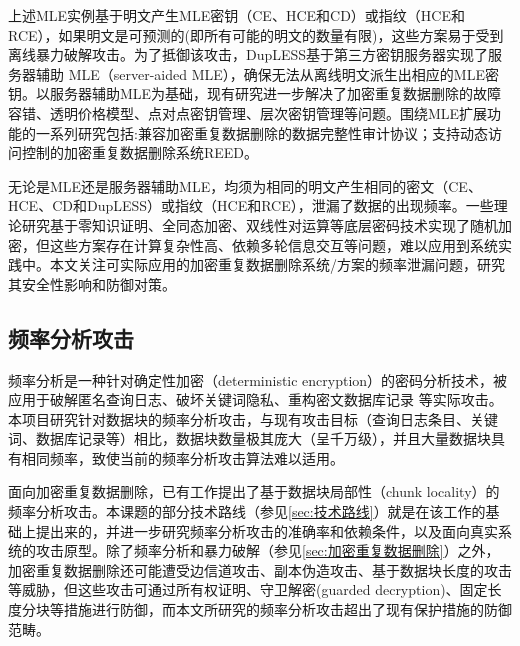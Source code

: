 上述MLE实例基于明文产生MLE密钥（CE、HCE和CD）或指纹（HCE和RCE），如果明文是可预测的(即所有可能的明文的数量有限)，这些方案易于受到离线暴力破解攻击。为了抵御该攻击，DupLESS基于第三方密钥服务器实现了服务器辅助 MLE（server-aided MLE），确保无法从离线明文派生出相应的MLE密钥。以服务器辅助MLE为基础，现有研究进一步解决了加密重复数据删除的故障容错、透明价格模型、点对点密钥管理、层次密钥管理等问题。围绕MLE扩展功能的一系列研究包括:兼容加密重复数据删除的数据完整性审计协议；支持动态访问控制的加密重复数据删除系统REED。

无论是MLE还是服务器辅助MLE，均须为相同的明文产生相同的密文（CE、HCE、CD和DupLESS）或指纹（HCE和RCE），泄漏了数据的出现频率。一些理论研究基于零知识证明、全同态加密、双线性对运算等底层密码技术实现了随机加密，但这些方案存在计算复杂性高、依赖多轮信息交互等问题，难以应用到系统实践中。本文关注可实际应用的加密重复数据删除系统/方案的频率泄漏问题，研究其安全性影响和防御对策。

\subsection{频率分析攻击}
\label{sec:传统频率分析攻击}

频率分析是一种针对确定性加密（deterministic encryption）的密码分析技术，被应用于破解匿名查询日志、破坏关键词隐私、重构密文数据库记录 等实际攻击。本项目研究针对数据块的频率分析攻击，与现有攻击目标（查询日志条目、关键词、数据库记录等）相比，数据块数量极其庞大（呈千万级），并且大量数据块具有相同频率，致使当前的频率分析攻击算法难以适用。

面向加密重复数据删除，已有工作提出了基于数据块局部性（chunk locality）的频率分析攻击。本课题的部分技术路线（参见\ref{sec:技术路线}）就是在该工作的基础上提出来的，并进一步研究频率分析攻击的准确率和依赖条件，以及面向真实系统的攻击原型。除了频率分析和暴力破解（参见\ref{sec:加密重复数据删除}）之外，加密重复数据删除还可能遭受边信道攻击、副本伪造攻击、基于数据块长度的攻击等威胁，但这些攻击可通过所有权证明、守卫解密(guarded decryption)、固定长度分块等措施进行防御，而本文所研究的频率分析攻击超出了现有保护措施的防御范畴。

